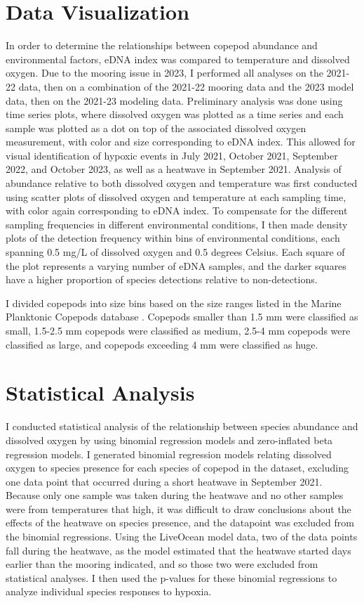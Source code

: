 \documentclass[12pt,twoside]{reedthesis}
\begin{document}
	\section{Data Visualization}
	In order to determine the relationships between copepod abundance and environmental factors, eDNA index was compared to temperature and dissolved oxygen. Due to the mooring issue in 2023, I performed all analyses on the 2021-22 data, then on a combination of the 2021-22 mooring data and the 2023 model data, then on the 2021-23 modeling data. Preliminary analysis was done using time series plots, where dissolved oxygen was plotted as a time series and each sample was plotted as a dot on top of the associated dissolved oxygen measurement, with color and size corresponding to eDNA index. This allowed for visual identification of hypoxic events in July 2021, October 2021, September 2022, and October 2023, as well as a heatwave in September 2021. Analysis of abundance relative to both dissolved oxygen and temperature was first conducted using scatter plots of dissolved oxygen and temperature at each sampling time, with color again corresponding to eDNA index. To compensate for the different sampling frequencies in different environmental conditions, I then made density plots of the detection frequency within bins of environmental conditions, each spanning 0.5 mg/L of dissolved oxygen and 0.5 degrees Celsius. Each square of the plot represents a varying number of eDNA samples, and the darker squares have a higher proportion of species detections relative to non-detections. 
	
	I divided copepods into size bins based on the size ranges listed in the Marine Planktonic Copepods database \autocite{WoRMSWorldRegister}. Copepods smaller than 1.5 mm were classified as small, 1.5-2.5 mm copepods were classified as medium, 2.5-4 mm copepods were classified as large, and copepods exceeding 4 mm were classified as huge.
	
	\section{Statistical Analysis}
	I conducted statistical analysis of the relationship between species abundance and dissolved oxygen by using binomial regression models and zero-inflated beta regression models. I generated binomial regression models relating dissolved oxygen to species presence for each species of copepod in the dataset, excluding one data point that occurred during a short heatwave in September 2021. Because only one sample was taken during the heatwave and no other samples were from temperatures that high, it was difficult to draw conclusions about the effects of the heatwave on species presence, and the datapoint was excluded from the binomial regressions. Using the LiveOcean model data, two of the data points fall during the heatwave, as the model estimated that the heatwave started days earlier than the mooring indicated, and so those two were excluded from statistical analyses. I then used the p-values for these binomial regressions to analyze individual species responses to hypoxia. 
	
\end{document}
